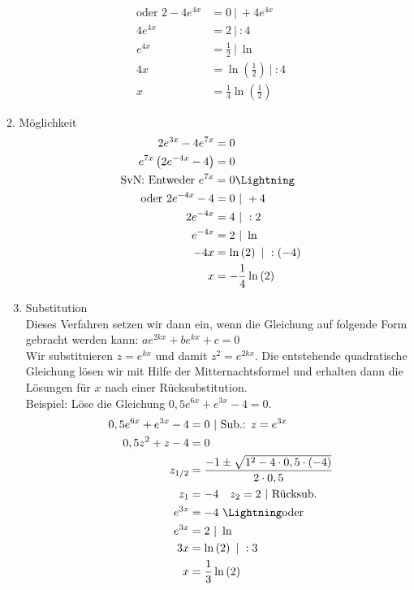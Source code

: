 \begin{enumerate}[label=\arabic*)]
\begin{minipage}{\textwidth}
\begin{minipage}[t]{0.49\textwidth}
{\begin{align*}
					\text{oder }2-4e^{4x}&=0\ |\ +4e^{4x}\\
					4e^{4x}&=2\ |\ :4\\
					e^{4x}&=\frac{1}{2}\ |\ \ln\\
					4x&=\ln\left(\tfrac{1}{2}\right)\ |\ :4\\
					x&=\frac{1}{4}\ln\left(\tfrac{1}{2}\right)
			\end{align*}}
		\end{minipage}
		\begin{minipage}[t]{0.49\textwidth}
			2. Möglichkeit
			\textcolor{loes}{\begin{align*}
					2e^{3x}-4e^{7x}&=0\\
					e^{7x}\left(2e^{-4x}-4\right) &=0\\
					\text{SvN: Entweder }e^{7x}&=0 \text{\Lightning}\\
					\text{oder }2e^{-4x}-4&=0\ |\ +4\\
					2e^{-4x}&=4\ |\ :2\\
					e^{-4x}&=2\ |\ \ln\\
					-4x&=\ln\left(2\right)\ |\ :(-4)\\
					x&=-\frac{1}{4}\ln\left(2\right)
			\end{align*}}
		\end{minipage}
	\end{minipage}
\end{enumerate}\newpage
\begin{enumerate}[label=\arabic*)]
	\setcounter{enumi}{2}
	\item Substitution\\
	Dieses Verfahren setzen wir dann ein, wenn die Gleichung auf folgende Form gebracht werden kann: \(ae^{2kx}+be^{kx}+c=0\)\\
	Wir substituieren \(z=e^{kx}\) und damit \(z^2=e^{2kx}\). Die entstehende quadratische Gleichung lösen wir mit Hilfe der Mitternachtsformel und erhalten dann die Lösungen für \(x\) nach einer Rücksubstitution.\\
	Beispiel: Löse die Gleichung \(0,5e^{6x}+e^{3x}-4=0\).
	\textcolor{loes}{\begin{align*}
			0,5e^{6x}+e^{3x}-4&=0\ |\ \text{Sub.: }z=e^{3x}\\
			0,5z^2+z-4&=0\\
			z_{1/2}&=\frac{-1\pm\sqrt{1^2-4\cdot 0,5\cdot \left(-4\right)}}{2\cdot 0,5}\\
			z_1&=-4\quad z_2=2\ |\ \text{Rücksub.}\\
			e^{3x}&=-4\text{ \Lightning\normalsize oder}\\
			e^{3x}&=2\ |\ \ln\\
			3x&=\ln\left(2\right)\ |\ :3\\
			x&=\frac{1}{3}\ln\left(2\right)
	\end{align*}}
\end{enumerate}
